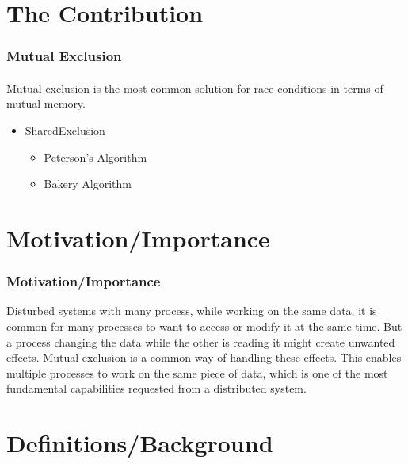 \documentclass[11pt]{beamer}              %
\begin{document}
\section{The Contribution}
\begin{frame}
\frametitle{Mutual Exclusion}
\framesubtitle{}
Mutual exclusion is the most common solution for race conditions in terms of mutual memory. 
\vspace{0.2in}
\begin{itemize}
\item SharedExclusion
\begin{itemize}
	\item Peterson's Algorithm
	\item Bakery Algorithm
\end{itemize}
\end{itemize}

\end{frame}


\section{Motivation/Importance}
\begin{frame}
\frametitle{Motivation/Importance}
Disturbed systems with many process, while working on the same data, it is common for many processes to want to access or modify it at the same time. But a process changing the data while the other is reading it might create unwanted effects. Mutual exclusion is a common way of handling these effects. This enables multiple processes to work on the same piece of data, which is one of the most fundamental capabilities requested from a distributed system.
\end{frame}

\section{Definitions/Background}

\end{document}
